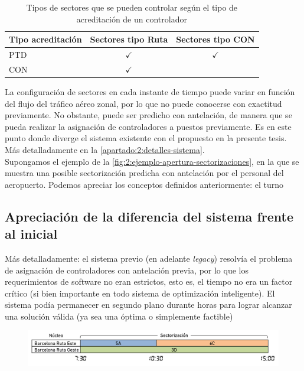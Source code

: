 \begin{table}[h]
    \centering
    \caption{Tipos de sectores que se pueden controlar según el tipo de acreditación de un controlador}
    \begin{tabular}{lcc}
    	\hline
    	\textbf{Tipo acreditación} & \textbf{Sectores tipo Ruta} & \textbf{Sectores tipo CON} \\ \hline
    	PTD                        &        $\checkmark$         &        $\checkmark$        \\
    	CON                        &        $\checkmark$         &                            \\ \hline
    \end{tabular}
    \label{table:2:acreditaciones}
\end{table}

La configuración de sectores en cada instante de tiempo puede variar en función del flujo del tráfico aéreo zonal, por 
lo que no puede conocerse con exactitud previamente. No obstante, puede ser predicho con antelación, de manera que 
se pueda realizar la asignación de controladores a puestos previamente.
Es en este punto donde diverge el sistema existente con el propuesto en la presente tesis. Más detalladamente en la 
\autoref{apartado:2:detalles-sistema}.
\\

Supongamos el ejemplo de la \autoref{fig:2:ejemplo-apertura-sectorizaciones}, en la que se muestra una posible 
sectorización predicha 
con antelación por el personal del aeropuerto. Podemos apreciar los conceptos definidos anteriormente: el turno

\subsection{Apreciación de la diferencia del sistema frente al inicial}
\label{apartado:2:detalles-sistema}
Más detalladamente: el sistema previo (en adelante \textit{legacy}) resolvía el problema de asignación de controladores 
con antelación previa, por lo que los requerimientos de software no eran estrictos, esto es, el tiempo no era un factor 
crítico (si bien importante en todo sistema de optimización inteligente). El sistema podía permanecer en segundo plano 
durante horas para lograr alcanzar una solución válida (ya sea una óptima o simplemente factible) 


\begin{figure}[htbp]
    \centering
    \includegraphics[width=\linewidth]{ejemplo-apertura-sectorizaciones}
    \caption{}
    \label{fig:2:ejemplo-apertura-sectorizaciones}
\end{figure}













